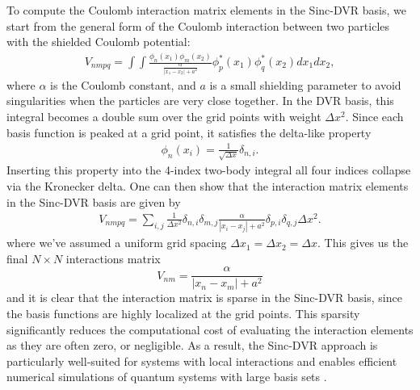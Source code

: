 \documentclass{subfiles}
\begin{document}
To compute the Coulomb interaction matrix elements in the Sinc-DVR basis, we start from the general form of the Coulomb interaction between two particles with the shielded Coulomb potential:
\begin{align*}
    V_{nmpq} = \int \int \frac{\phi_n(x_1)\phi_m(x_2)}{\frac{\alpha}{|x_1 - x_2| + a^2}}\phi_p^*(x_1)\phi_q^*(x_2) dx_1 dx_2,
\end{align*}
where $\alpha$ is the Coulomb constant, and $a$ is a small shielding parameter to avoid singularities when the particles are very close together. In the DVR basis, this integral becomes a double sum over the grid points with weight $\Delta x^2$. Since each basis function is peaked at a grid point, it satisfies the delta-like property
\begin{align*}
    \phi_n(x_i) = \frac{1}{\sqrt{\Delta x}}\delta_{n,i}.
\end{align*}
Inserting this property into the 4-index two-body integral all four indices collapse via the Kronecker delta. One can then show that the interaction matrix elements in the Sinc-DVR basis are given by
\begin{align*}
    V_{nmpq} = \sum_{i,j}\frac{1}{\Delta x^2}\delta_{n,i}\delta_{m,j}\frac{\alpha}{|x_i - x_j| + a^2}\delta_{p,i}\delta_{q,j} \Delta x^2.
\end{align*}
where we've assumed a uniform grid spacing $\Delta x_1 = \Delta x_2 = \Delta x$. This gives us the final $N\times N$ interactions matrix
\begin{equation}
    V_{nm} = \frac{\alpha}{|x_n - x_m| + a^2}\label{eq:sinc_dvr_coulomb}
\end{equation}
and it is clear that the interaction matrix is sparse in the Sinc-DVR basis, since the basis functions are highly localized at the grid points. This sparsity significantly reduces the computational cost of evaluating the interaction elements as they are often zero, or negligible. As a result, the Sinc-DVR approach is particularly well-suited for systems with local interactions and enables efficient numerical simulations of quantum systems with large basis sets \cite{light2000discrete}.
\end{document}

